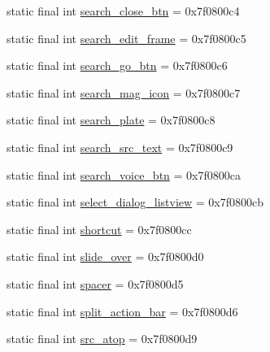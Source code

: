 \begin{DoxyCompactItemize}
\item 
static final int \mbox{\hyperlink{classcom_1_1synnapps_1_1carouselview_1_1_r_1_1id_a8ea96ef77ad32c7224638240ce82da51}{search\+\_\+close\+\_\+btn}} = 0x7f0800c4
\item 
static final int \mbox{\hyperlink{classcom_1_1synnapps_1_1carouselview_1_1_r_1_1id_ac141245f10b7290f9a7dd44296a287c5}{search\+\_\+edit\+\_\+frame}} = 0x7f0800c5
\item 
static final int \mbox{\hyperlink{classcom_1_1synnapps_1_1carouselview_1_1_r_1_1id_a1214104b2484a0a386f32c51dc1513c5}{search\+\_\+go\+\_\+btn}} = 0x7f0800c6
\item 
static final int \mbox{\hyperlink{classcom_1_1synnapps_1_1carouselview_1_1_r_1_1id_ac7dc150e5503560ff532e4514e33a03c}{search\+\_\+mag\+\_\+icon}} = 0x7f0800c7
\item 
static final int \mbox{\hyperlink{classcom_1_1synnapps_1_1carouselview_1_1_r_1_1id_ab03952081dd78417ab1dc63b99c3f1f2}{search\+\_\+plate}} = 0x7f0800c8
\item 
static final int \mbox{\hyperlink{classcom_1_1synnapps_1_1carouselview_1_1_r_1_1id_a48e79475bb93707b2410c7ddae8a64cb}{search\+\_\+src\+\_\+text}} = 0x7f0800c9
\item 
static final int \mbox{\hyperlink{classcom_1_1synnapps_1_1carouselview_1_1_r_1_1id_abcc285c6dd4e8ddfb299d9d40f3d212a}{search\+\_\+voice\+\_\+btn}} = 0x7f0800ca
\item 
static final int \mbox{\hyperlink{classcom_1_1synnapps_1_1carouselview_1_1_r_1_1id_afd356f9714ce56227961675c04eabc74}{select\+\_\+dialog\+\_\+listview}} = 0x7f0800cb
\item 
static final int \mbox{\hyperlink{classcom_1_1synnapps_1_1carouselview_1_1_r_1_1id_a3d16af11bfb453562e296a46801f3a23}{shortcut}} = 0x7f0800cc
\item 
static final int \mbox{\hyperlink{classcom_1_1synnapps_1_1carouselview_1_1_r_1_1id_ae4e46d521546d20024b037d7bee1f9ad}{slide\+\_\+over}} = 0x7f0800d0
\item 
static final int \mbox{\hyperlink{classcom_1_1synnapps_1_1carouselview_1_1_r_1_1id_a7a7d1348164655b1e8b3fb531b4891c3}{spacer}} = 0x7f0800d5
\item 
static final int \mbox{\hyperlink{classcom_1_1synnapps_1_1carouselview_1_1_r_1_1id_aa725c406aa13581b7d66bc518605a112}{split\+\_\+action\+\_\+bar}} = 0x7f0800d6
\item 
static final int \mbox{\hyperlink{classcom_1_1synnapps_1_1carouselview_1_1_r_1_1id_a2d1c08a9a65967fb0bedcea2362c9972}{src\+\_\+atop}} = 0x7f0800d9

\end{DoxyCompactItemize}
